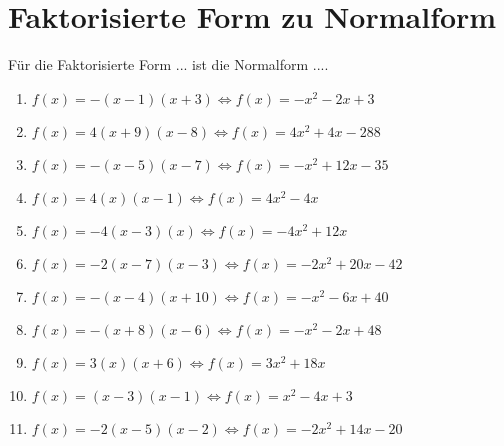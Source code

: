 \documentclass{article}%
\begin{document}
\section{Faktorisierte Form zu Normalform}%
\label{sec:FaktorisierteFormzuNormalform}%
Für die Faktorisierte Form ... ist die Normalform ....%
\begin{enumerate}[label=\alph*)]%
\item%
\newline\vspace{0.5cm}$f(x)=-(x-1)(x+3)\Leftrightarrow f(x)=-x^2 - 2x + 3$%
\item%
\newline\vspace{0.5cm}$f(x)=4(x+9)(x-8)\Leftrightarrow f(x)=4x^2 + 4x - 288$%
\item%
\newline\vspace{0.5cm}$f(x)=-(x-5)(x-7)\Leftrightarrow f(x)=-x^2 + 12x - 35$%
\item%
\newline\vspace{0.5cm}$f(x)=4(x)(x-1)\Leftrightarrow f(x)=4x^2 - 4x$%
\item%
\newline\vspace{0.5cm}$f(x)=-4(x-3)(x)\Leftrightarrow f(x)=-4x^2 + 12x$%
\item%
\newline\vspace{0.5cm}$f(x)=-2(x-7)(x-3)\Leftrightarrow f(x)=-2x^2 + 20x - 42$%
\item%
\newline\vspace{0.5cm}$f(x)=-(x-4)(x+10)\Leftrightarrow f(x)=-x^2 - 6x + 40$%
\item%
\newline\vspace{0.5cm}$f(x)=-(x+8)(x-6)\Leftrightarrow f(x)=-x^2 - 2x + 48$%
\item%
\newline\vspace{0.5cm}$f(x)=3(x)(x+6)\Leftrightarrow f(x)=3x^2 + 18x$%
\item%
\newline\vspace{0.5cm}$f(x)=(x-3)(x-1)\Leftrightarrow f(x)=x^2 - 4x + 3$%
\item%
\newline\vspace{0.5cm}$f(x)=-2(x-5)(x-2)\Leftrightarrow f(x)=-2x^2 + 14x - 20$%

\end{enumerate}
\end{document}
